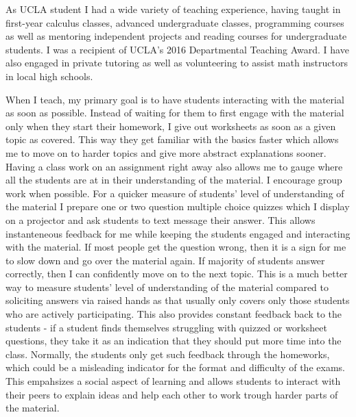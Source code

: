 \documentclass[11pt]{article}
\begin{document}
As UCLA student I had a wide variety of teaching experience, 
having taught in first-year calculus classes, advanced undergraduate classes, programming courses
as well as mentoring independent projects and reading courses for undergraduate students.
I was a recipient of UCLA's 2016 Departmental Teaching Award.
I have also engaged in private tutoring as well as volunteering to assist math instructors in local high schools.

When I teach, my primary goal is to have students interacting with the material as soon as possible.
Instead of waiting for them to first engage with the material only when they start their homework,
I give out worksheets as soon as a given topic as covered.
This way they get familiar with the basics faster which allows me to move on to harder topics and
give more abstract explanations sooner.
Having a class work on an assignment right away also allows me to gauge where all the students are at in their understanding of the material.
I encourage group work when possible.
For a quicker measure of students' level of understanding of the material I prepare one or two question multiple choice quizzes which I display on a projector and ask students to text message their answer.
This allows instanteneous feedback for me while keeping the students engaged and interacting with the material.
If most people get the question wrong, then it is a sign for me to slow down and go over the material again.
If majority of students answer correctly, then I can confidently move on to the next topic.
This is a much better way to measure students' level of understanding of the material compared to soliciting answers via raised hands as that usually only covers only those students who are actively participating.
This also provides constant feedback back to the students - if a student finds themselves struggling with quizzed or worksheet questions, they take it as an indication that they should put more time into the class.
Normally, the students only get such feedback through the homeworks, which could be a misleading indicator for the format and difficulty of the exams.
This empahsizes a social aspect of learning and allows students to interact with their peers to explain ideas and help each other to work trough harder parts of the material.
\end{document}
